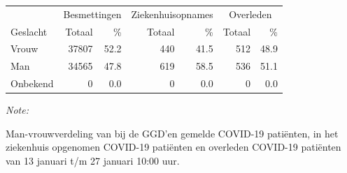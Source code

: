 \documentclass[
  english,
  man,floatsintext]{apa6}
\begin{document}
\begin{table}[H]
\centering\begingroup\fontsize{11}{13}\selectfont

\begin{threeparttable}
\begin{tabular}{lrrrrrr}
\toprule
\multicolumn{1}{c}{ } & \multicolumn{2}{c}{Besmettingen} & \multicolumn{2}{c}{Ziekenhuisopnames} & \multicolumn{2}{c}{Overleden} \\
\cmidrule(l{3pt}r{3pt}){2-3} \cmidrule(l{3pt}r{3pt}){4-5} \cmidrule(l{3pt}r{3pt}){6-7}
Geslacht & Totaal & \% & Totaal & \% & Totaal & \%\\
\midrule
Vrouw & 37807 & 52.2 & 440 & 41.5 & 512 & 48.9\\
Man & 34565 & 47.8 & 619 & 58.5 & 536 & 51.1\\
Onbekend & 0 & 0.0 & 0 & 0.0 & 0 & 0.0\\
\bottomrule
\end{tabular}
\begin{tablenotes}
\item \textit{Note: } 
\item Man-vrouwverdeling van bij de GGD’en gemelde COVID-19 patiënten, in het ziekenhuis opgenomen COVID-19 patiënten en overleden COVID-19 patiënten van 13 januari t/m 27 januari 10:00 uur.
\end{tablenotes}
\end{threeparttable}
\endgroup{}
\end{table}
\newpage
\end{document}
